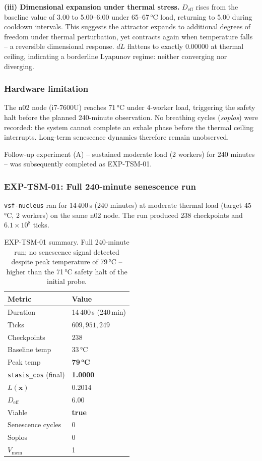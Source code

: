 \documentclass[11pt, a4paper]{article}
\newcommand{\nucleus}{\texttt{vsf-nucleus}}
\begin{document}
\textbf{(iii) Dimensional expansion under thermal stress.}
$D_\text{eff}$ rises from the baseline value of 3.00 to 5.00--6.00
under 65--67\,°C load, returning to 5.00 during cooldown intervals.
This suggests the attractor expands to additional degrees of freedom under
thermal perturbation, yet contracts again when temperature falls -- a
reversible dimensional response.
$\overline{dL}$ flattens to exactly 0.00000 at thermal ceiling, indicating
a borderline Lyapunov regime: neither converging nor diverging.

\subsubsection*{Hardware limitation}

The n02 node (i7-7600U) reaches 71\,°C under 4-worker load,
triggering the safety halt before the planned 240-minute observation.
No breathing cycles (\textit{soplos}) were recorded: the system cannot
complete an exhale phase before the thermal ceiling interrupts.
Long-term senescence dynamics therefore remain unobserved.

Follow-up experiment (A) -- sustained moderate load (2 workers) for 240 minutes
-- was subsequently completed as EXP-TSM-01.

\subsubsection*{EXP-TSM-01: Full 240-minute senescence run}

\nucleus{} ran for 14\,400\,s (240 minutes) at moderate thermal load
(target 45\,°C, 2 workers) on the same n02 node.
The run produced 238 checkpoints and $6.1 \times 10^8$ ticks.

\begin{table}[!htb]
\centering
\begin{tabular}{ll}
\toprule
Metric & Value \\
\midrule
Duration & 14\,400\,s (240\,min) \\
Ticks & $609{,}951{,}249$ \\
Checkpoints & 238 \\
Baseline temp & 33\,°C \\
Peak temp & \textbf{79\,°C} \\
\texttt{stasis\_cos} (final) & \textbf{1.0000} \\
$L(\mathbf{x})$ & 0.2014 \\
$D_\text{eff}$ & 6.00 \\
Viable & \textbf{true} \\
Senescence cycles & 0 \\
Soplos & 0 \\
$V_\text{mem}$ & 1 \\
\bottomrule
\end{tabular}
\caption{EXP-TSM-01 summary. Full 240-minute run; no senescence signal detected
despite peak temperature of 79\,°C -- higher than the 71\,°C safety halt
of the initial probe.}
\label{tab:tsm01}
\end{table}
\end{document}
